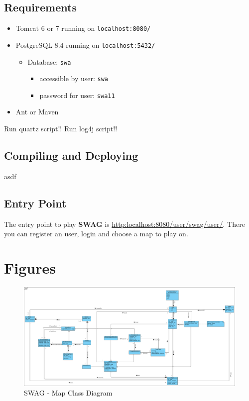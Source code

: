 \documentclass[11pt]{article}
\begin{document}
\subsection{Requirements}

\begin{itemize}
\item Tomcat 6 or 7 running on \texttt{localhost:8080/}
\item PostgreSQL 8.4 running on \texttt{localhost:5432/}
	\begin{itemize}
	\item Database: \texttt{swa}
		\begin{itemize}
		\item accessible by user: \texttt{swa}
		\item password for user: \texttt{swa11}
		\end{itemize}
	\end{itemize}
\item Ant or Maven
\end{itemize}

Run quartz script!!
Run log4j script!!

\subsection{Compiling and Deploying}
asdf

\subsection{Entry Point}

The entry point to play \textbf{SWAG} is \href{http:localhost:8080/user/swag/user/}{http:localhost:8080/user/swag/user/}. There you can register an user, login and choose a map to play on.

\newpage

\appendix
\section{Figures}

\begin{figure}[h]
\center
\includegraphics[angle=90, scale=0.3]{diagrams/map.png}
\caption{SWAG - Map Class Diagram}
\label{fig:map_cd}
\end{figure}
\end{document}
